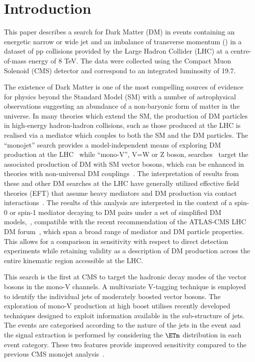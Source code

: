 \section{Introduction}
This paper describes a search for Dark Matter (DM) in events containing an
energetic narrow or wide jet and an imbalance of transverse momentum (\ETm) in a
dataset of pp collisions provided by the Large Hadron Collider (LHC) at a
centre-of-mass energy of 8 TeV. The data were collected using the Compact Muon
Solenoid (CMS) detector and correspond to an integrated luminosity of
19.7\fbinv. 

The existence of Dark Matter is one of the most compelling sources of evidence
for physics beyond the Standard Model (SM) with a number of astrophysical
observations suggesting an abundance of a non-baryonic form of matter in the
universe. In many theories which extend the SM, the production of DM particles
in high-energy hadron-hadron collisions, such as those produced at the LHC is
realised via a mediator which couples to both the SM and the DM particles.  The
``monojet'' search provides a model-independent means of exploring DM production
at the LHC~\cite{monojet1,monojet2} while ``mono-V'', V=W or Z boson,
searches~\cite{monolep,Aad:2014vka,Aad:2013oja,ATLAS:2014wra} target the
associated production of DM with SM vector bosons, which can be enhanced in
theories with non-universal DM couplings~\cite{IVDM}.  The interpretation of
results from these and other DM searches at the LHC have generally utilized
effective field theories (EFT) that assume heavy mediators and DM production via
contact interactions~\cite{Fox:2011pm}.  The results of this analysis are
interpreted in the context of a spin-0 or spin-1 mediator decaying to DM pairs
under a set of simplified DM
models,~\cite{simplified1,Buchmueller:2013dya,Buchmueller:2014yoa}, compatible
with the recent recommendation of the ATLAS-CMS LHC DM
forum~\cite{Abercrombie:2015wmb}, which span a broad range of mediator and DM
particle properties. This allows for a comparison in sensitivity with respect to
direct detection experiments while retaining validity as a description of DM
production across the entire kinematic region accessible at the LHC. 

This search is the first at CMS to target the hadronic decay modes of the vector
bosons in the mono-V channels. A multivariate V-tagging technique is employed to
identify the individual jets of moderately boosted vector bosons. The
exploration of mono-V production at high boost utilises recently developed
techniques designed to exploit information available in the sub-structure of
jets. The events are categorised according to the nature of the jets in the
event and the signal extraction is performed by considering the $\ETm$
distribution in each event category. These two features provide improved
sensitivity compared to the previous CMS monojet analysis~\cite{monojet1}. 




